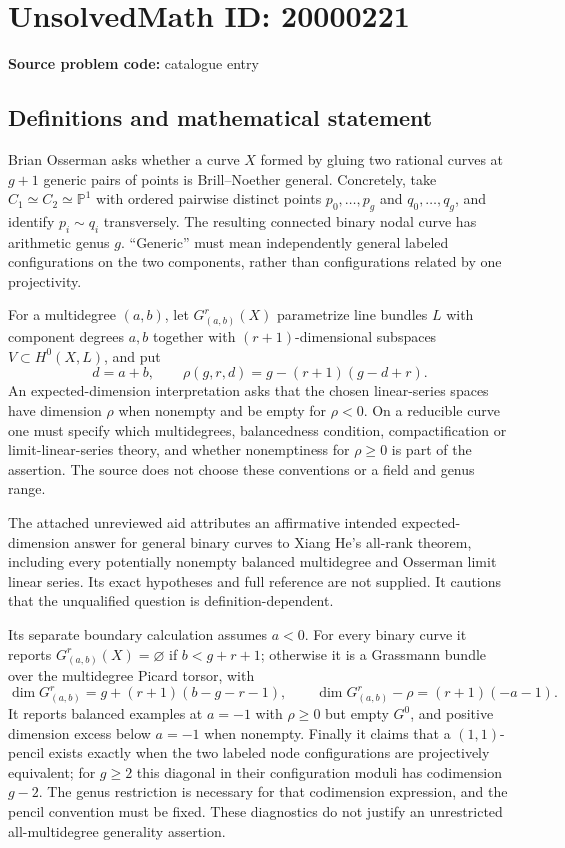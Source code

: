 \documentclass[11pt]{article}
\newcommand{\PP}{\mathbb{P}}
\begin{document}
\section*{UnsolvedMath ID: 20000221}
\textbf{Source problem code:} catalogue entry
\subsection{Definitions and mathematical statement}
Brian Osserman asks whether a curve $X$ formed by gluing two rational curves at $g+1$ generic pairs of points is Brill--Noether general. Concretely, take $C_1\simeq C_2\simeq\PP^1$ with ordered pairwise distinct points $p_0,\ldots,p_g$ and $q_0,\ldots,q_g$, and identify $p_i\sim q_i$ transversely. The resulting connected binary nodal curve has arithmetic genus $g$. ``Generic'' must mean independently general labeled configurations on the two components, rather than configurations related by one projectivity.

For a multidegree $(a,b)$, let $G^r_{(a,b)}(X)$ parametrize line bundles $L$ with component degrees $a,b$ together with $(r+1)$-dimensional subspaces $V\subset H^0(X,L)$, and put
\[
d=a+b,\qquad \rho(g,r,d)=g-(r+1)(g-d+r).
\]
An expected-dimension interpretation asks that the chosen linear-series spaces have dimension $\rho$ when nonempty and be empty for $\rho<0$. On a reducible curve one must specify which multidegrees, balancedness condition, compactification or limit-linear-series theory, and whether nonemptiness for $\rho\ge0$ is part of the assertion. The source does not choose these conventions or a field and genus range.

The attached unreviewed aid attributes an affirmative intended expected-dimension answer for general binary curves to Xiang He's all-rank theorem, including every potentially nonempty balanced multidegree and Osserman limit linear series. Its exact hypotheses and full reference are not supplied. It cautions that the unqualified question is definition-dependent.

Its separate boundary calculation assumes $a<0$. For every binary curve it reports $G^r_{(a,b)}(X)=\varnothing$ if $b<g+r+1$; otherwise it is a Grassmann bundle over the multidegree Picard torsor, with
\[
\dim G^r_{(a,b)}=g+(r+1)(b-g-r-1),\qquad
\dim G^r_{(a,b)}-\rho=(r+1)(-a-1).
\]
It reports balanced examples at $a=-1$ with $\rho\ge0$ but empty $G^0$, and positive dimension excess below $a=-1$ when nonempty. Finally it claims that a $(1,1)$-pencil exists exactly when the two labeled node configurations are projectively equivalent; for $g\ge2$ this diagonal in their configuration moduli has codimension $g-2$. The genus restriction is necessary for that codimension expression, and the pencil convention must be fixed. These diagnostics do not justify an unrestricted all-multidegree generality assertion.
\end{document}
